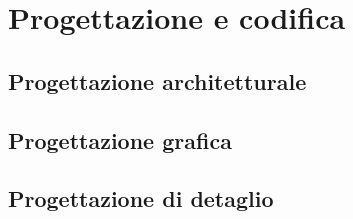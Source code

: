 
\chapter{Progettazione e codifica}\label{chap:design}
\section {Progettazione architetturale}

\section{Progettazione grafica}

\section{Progettazione di detaglio}